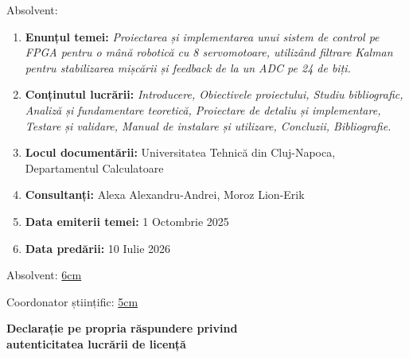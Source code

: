 \vspace{2cm}

\begin{center}
	Absolvent: {\bf \thesisauthor}

	\vspace{1cm}

	{\bf \thesistitle}
\end{center}

\vspace{5mm}

\begin{enumerate}
	\item {\bf Enunțul temei:} {\it Proiectarea și implementarea unui sistem de control pe FPGA pentru o mână robotică cu 8 servomotoare, utilizând filtrare Kalman pentru stabilizarea mișcării și feedback de la un ADC pe 24 de biți.}
	\item {\bf Conținutul lucrării:} {\it Introducere, Obiectivele proiectului, Studiu bibliografic, Analiză și fundamentare teoretică, Proiectare de detaliu și implementare, Testare și validare, Manual de instalare și utilizare, Concluzii, Bibliografie.}
	\item {\bf Locul documentării:} Universitatea Tehnică din Cluj-Napoca, Departamentul Calculatoare
	\item {\bf Consultanți:} Alexa Alexandru-Andrei, Moroz Lion-Erik
	\item {\bf Data emiterii temei:} 1 Octombrie 2025
	\item {\bf Data predării:} 10 Iulie 2026
\end{enumerate}
\vspace{1.2cm}

\hspace{6cm} Absolvent: \uline{6cm}

\vspace{0.5cm}
\hspace{6cm} Coordonator științific: \uline{5cm}
\newpage

\begin{center}
	{\department}
\end{center}
\vspace{0.5cm}

\begin{center}
	{\bf Declarație pe propria răspundere privind\\
		autenticitatea lucrării de licență}
\end{center}
\vspace{1cm}

